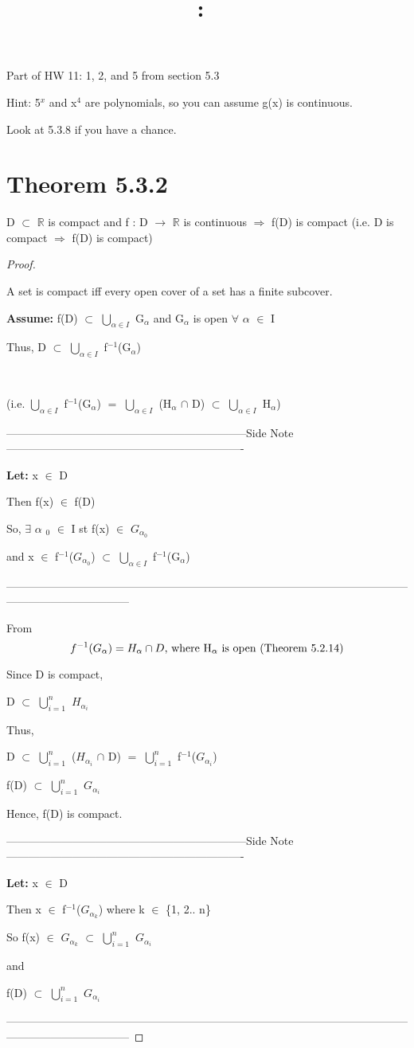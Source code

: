 \documentclass{article}
\title{
    \vspace{2in}
    \textmd{\textbf{\hmwkClass:\ \hmwkTitle}}\\
    \normalsize\vspace{0.1in}\small\vspace{0.1in}\large{\textit{\hmwkClassInstructor}}
    \vspace{3in}
}
\author{\hmwkAuthorName}
\date{}
\newcommand{\mt}[1]{\ensuremath{#1}}
\newcommand\bsc[2][\DefaultOpt]{%
  \def\DefaultOpt{#2}%
  \section[#1]{#2}%
}
\newcommand{\bgpf}{\begin{proof} $ $\newline}
\newcommand{\lt}[1]{\textbf{Let: } #1}
\newcommand{\as}[1]{\textbf{Assume: } #1}
\newcommand{\epf}{\end{proof}}
\newcommand{\dbs}[3]{\mt{#1_{#2_#3}}}
\newcommand{\sidenote}[1]{-----------------------------------------------------------------Side Note----------------------------------------------------------------
#1 \

---------------------------------------------------------------------------------------------------------------------------------------------}
\newcommand{\br}{\mt{\mathbb{R}} }       %
\newcommand{\fa}{\mt{\forall} }          %
\newcommand{\afa}{\mt{\alpha} }
\newcommand{\mem}{\mt{\in} }
\newcommand{\exs}{\mt{\exists} }
\newcommand{\sbs}{\mt{\subset} }         %
\newcommand{\lra}{ \mt{\longrightarrow} } %
\newcommand{\rar}{ \mt{\Rightarrow} }     %
\newcommand{\bk}[1]{\{#1\}}
\newcommand{\eql}{\mt{=} }
\newcommand{\uw}[2]{#1\mt{_{#2}}}
\newcommand{\uf}[2]{#1\mt{^{#2}}}
\newcommand{\urng}[2]{\mt{\bigcup_{#1}^{#2}}}
\newcommand{\eqn}[1]{\[#1\]}
\newcommand{\inn}{\mt{\cap} }
\begin{document}
Part of HW 11: 1, 2, and 5 from section 5.3

Hint: \uf{5}{x} and \uf{x}{4} are polynomials, so you can assume g(x) is continuous.

Look at 5.3.8 if you have a chance.

\bsc{Theorem 5.3.2}{

D \sbs \br is compact and f : D \lra \br is continuous \rar f(D) is compact (i.e. D is compact \rar f(D) is compact)

\bgpf

A set is compact iff every open cover of a set has a finite subcover.

\as{f(D) \sbs \urng{\afa \mem I}{} \uw{G}{\afa} and \uw{G}{\afa} is open \fa \afa \mem I}

Thus, D \sbs \urng{\afa \mem I}{} \uf{f}{-1}(\uw{G}{\afa})

\

(i.e. \urng{\afa \mem I}{} \uf{f}{-1}(\uw{G}{\afa}) \eql \urng{\afa \mem I}{} (\uw{H}{\afa} \inn D) \sbs \urng{\afa \mem I}{} \uw{H}{\afa})

\sidenote{
\lt{x \mem D}

Then f(x) \mem f(D)

So, \exs \uw{\afa}{0} \mem I st f(x) \mem \dbs{G}{\afa}{0}

and x \mem \uf{f}{-1}(\dbs{G}{\afa}{0}) \sbs \urng{\afa \mem I}{} \uf{f}{-1}(\uw{G}{\afa})
}

From 
\eqn{f^{-1}(G_\alpha) = H_\alpha \inn D \textrm{, where \uw{H}{\afa} is open (Theorem 5.2.14)}}

Since D is compact,

D \sbs \urng{i = 1}{n} \dbs{H}{\afa}{i}

Thus,

D \sbs \urng{i = 1}{n} (\dbs{H}{\afa}{i} \inn D) \eql \urng{i = 1}{n} \uf{f}{-1}(\dbs{G}{\afa}{i})

f(D) \sbs \urng{i = 1}{n} \dbs{G}{\afa}{i}

Hence, f(D) is compact.

\sidenote{
\lt{x \mem D}

Then x \mem \uf{f}{-1}(\dbs{G}{\afa}{k}) where k \mem \bk{1, 2.. n}

So f(x) \mem \dbs{G}{\afa}{k} \sbs \urng{i = 1}{n} \dbs{G}{\afa}{i}

and

f(D) \sbs \urng{i = 1}{n} \dbs{G}{\afa}{i}
}
\epf
}

\newpage 
\end{document}

